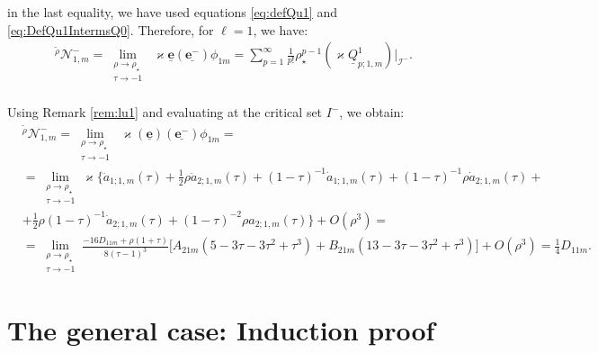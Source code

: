in the last equality, we have used equations \eqref{eq:defQu1} and \eqref{eq:DefQu1IntermsQ0}. Therefore, for $\ell=1$, we have:
\begin{align}
  \mathcal{}^{\tilde{\rho}}\mathcal{N}^{-}_{1,m} = \lim_{\substack{\rho \to \rho_{\star} \\ \tau \to -1}} \; \varkappa\underline{\boldsymbol{e}}(\underline{\boldsymbol{e}^{-}})\phi_{1m} = \sum_{p=1}^{\infty}\frac{1}{p!}\rho_{\star}^{p-1}(\varkappa \underline{Q}^{1}_{p;1,m})|_{\mathscr{I}^{-}}.
\end{align}
\\
Using Remark \ref{rem:lu1} and evaluating at the critical set $I^{-}$, we obtain:
\begin{align}
  & \mathcal{}^{\tilde{\rho}}\mathcal{N}^{-}_{1,m} = \lim_{\substack{\rho \to \rho_{\star} \\ \tau \to -1}} \; \varkappa(\underline{\boldsymbol{e}}) (\underline{\boldsymbol{e}^{-}}) \phi_{1m} = \nonumber \\
  & = \lim_{\substack{\rho \to \rho_{\star} \\ \tau \to -1}} \varkappa\biggl\{\ddot{a}_{1;1,m}(\tau)+\frac{1}{2}\rho \ddot{a}_{2;1,m}(\tau) + (1-\tau)^{-1}\dot{a}_{1;1,m}(\tau)+(1-\tau)^{-1}\rho \dot{a}_{2;1,m}(\tau)+ \nonumber \\
  & + \frac{1}{2}\rho(1-\tau)^{-1}\dot{a}_{2;1,m}(\tau)+(1-\tau)^{-2}\rho a_{2;1,m}(\tau)\biggr\} + O(\rho^{3}) = \nonumber \\
  & = \lim_{\substack{\rho \to \rho_{\star} \\ \tau \to -1}}\frac{-16D_{11m}+\rho(1+\tau)}{8(\tau-1)^{3}}\biggl[A_{21m}(5-3\tau -3\tau^{2}+\tau^{3}) + B_{21m}(13-3\tau -3\tau^{2}+\tau^{3})\biggr] + O(\rho^{3})=  \frac{1}{4}D_{11m}.
\end{align}
\section{The general case: Induction proof}
\label{sec:induction_argument}

